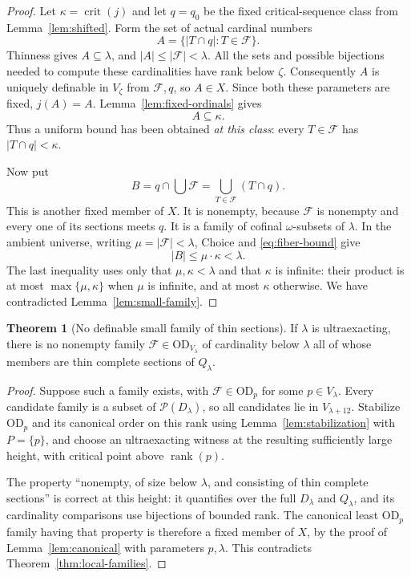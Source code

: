 \documentclass[11pt,letterpaper]{article}
\theoremstyle{definition}
\newtheorem{theorem}[definition]{Theorem}
\newcommand{\OD}{\mathrm{OD}}
\newcommand{\crit}{\operatorname{crit}}
\newcommand{\rank}{\operatorname{rank}}
\numberwithin{equation}{section}
\newcommand{\Pow}{\mathcal P}
\begin{document}
\begin{proof}
Let $\kappa=\crit(j)$ and let $q=q_0$ be the fixed critical-sequence class
from Lemma~\ref{lem:shifted}. Form the set of actual cardinal numbers
\[
       A=\{|T\cap q|:T\in\mathcal F\}.
\]
Thinness gives $A\subseteq\lambda$, and $|A|\le|\mathcal F|<\lambda$.
All the sets and possible bijections needed to compute these cardinalities
have rank below $\zeta$. Consequently $A$ is uniquely definable in $V_\zeta$
from $\mathcal F,q$, so $A\in X$. Since both these parameters are fixed,
$j(A)=A$. Lemma~\ref{lem:fixed-ordinals} gives
\begin{equation}\label{eq:fiber-bound}
                       A\subseteq\kappa.
\end{equation}
Thus a uniform bound has been obtained \emph{at this class}: every
$T\in\mathcal F$ has $|T\cap q|<\kappa$.

Now put
\[
              B=q\cap\bigcup\mathcal F
                =\bigcup_{T\in\mathcal F}(T\cap q).
\]
This is another fixed member of $X$. It is nonempty, because $\mathcal F$
is nonempty and every one of its sections meets $q$. It is a family of
cofinal $\omega$-subsets of $\lambda$. In the ambient universe, writing
$\mu=|\mathcal F|<\lambda$, Choice and \eqref{eq:fiber-bound} give
\[
                  |B|\le\mu\cdot\kappa<\lambda.
\]
The last inequality uses only that $\mu,\kappa<\lambda$ and that $\kappa$
is infinite: their product is at most $\max\{\mu,\kappa\}$ when $\mu$ is
infinite, and at most $\kappa$ otherwise. We have contradicted
Lemma~\ref{lem:small-family}.
\end{proof}

\begin{theorem}[No definable small family of thin sections]\label{thm:families}
If $\lambda$ is ultraexacting, there is no nonempty family
$\mathcal F\in\OD_{V_\lambda}$ of cardinality below $\lambda$ all of whose
members are thin complete sections of $Q_\lambda$.
\end{theorem}

\begin{proof}
Suppose such a family exists, with $\mathcal F\in\OD_p$ for some
$p\in V_\lambda$. Every candidate family is a subset of $\Pow(D_\lambda)$,
so all candidates lie in $V_{\lambda+12}$. Stabilize $\OD_p$ and its canonical
order on this rank using Lemma~\ref{lem:stabilization} with $P=\{p\}$, and choose an
ultraexacting witness at the resulting sufficiently large height, with
critical point above $\rank(p)$.

The property ``nonempty, of size below $\lambda$, and consisting of thin
complete sections'' is correct at this height: it quantifies over the full
$D_\lambda$ and $Q_\lambda$, and its cardinality comparisons use bijections
of bounded rank. The canonical least $\OD_p$ family having that property is
therefore a fixed member of $X$, by the proof of
Lemma~\ref{lem:canonical} with parameters $p,\lambda$. This contradicts
Theorem~\ref{thm:local-families}.
\end{proof}
\end{document}
